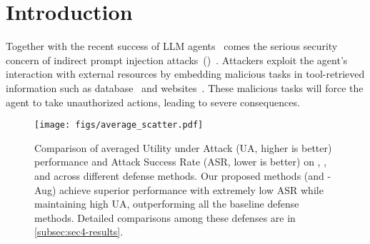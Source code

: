 \section{Introduction}
\label{sec:intro}

Together with the recent success of LLM agents~\citep{openai_tool_use, anthropic_tool_use, llama_tool_use, deepseek2025} comes the serious security concern of indirect prompt injection attacks~(\ipi)~\cite{naihin2023testing, ruan2024identifying, yuan2024rjudge, liu2024formalizing, zhan24injecagent, debenedetti2024agentdojo, zhang2024agent}.
Attackers exploit the agent's interaction with external resources by embedding malicious tasks in tool-retrieved information such as database~\cite{zhong-etal-2023-poisoning, zou2024poisonedrag} and websites~\cite{liao2024eia, xu2024advweb, wu2024agentattack}.
These malicious tasks will force the agent to take unauthorized actions, leading to severe consequences. %

\begin{figure}[t!]
    \centering
    \texttt{[image: figs/average\_scatter.pdf]}
    \vspace{-0.3in}
    \caption{Comparison of averaged Utility under Attack (UA, higher is better) performance and Attack Success Rate (ASR, lower is better) on \gpt, \othree, and \llama across different defense methods. %
    Our proposed methods (\method and \method-Aug) achieve superior performance with extremely low ASR while maintaining high UA, outperforming all the baseline defense methods. Detailed comparisons among these defenses are in \cref{subsec:sec4-results}.}
    \label{fig: average_scatter}
    \vspace{-.1in}
\end{figure}

